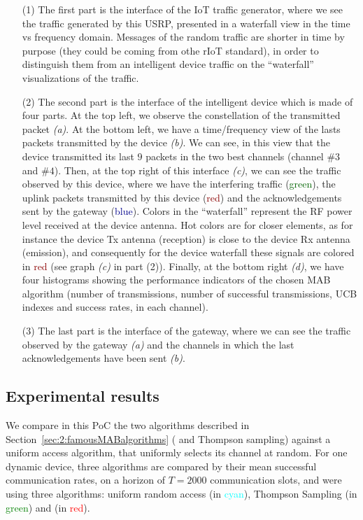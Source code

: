 \begin{enumerate}[leftmargin=6mm]
    \item[(1)]
The first part is the interface of the IoT traffic generator, where we see the traffic generated by this USRP, presented in a waterfall view in the time vs frequency domain.
Messages of the random traffic are shorter in time by purpose (they could be coming from othe rIoT standard), in order to distinguish them from an intelligent device traffic on the ``waterfall'' visualizations of the traffic.

    \item[(2)]
The second part is the interface of the intelligent device which is made of four parts.
At the top left, we observe the constellation of the transmitted packet \emph{(a)}.
At the bottom left, we have a time/frequency view of the lasts packets transmitted by the device \emph{(b)}.
We can see, in this view that the device transmitted its last $9$ packets in the two best channels (channel $\#3$ and $\#4$).
Then, at the top right of this interface \emph{(c)}, we can see the traffic observed by this device, where we have the interfering traffic (\textcolor{darkgreen}{green}), the uplink packets transmitted by this device (\textcolor{darkred}{red}) and the acknowledgements sent by the gateway (\textcolor{darkblue}{blue}).
Colors in the ``waterfall'' represent the RF power level received at the device antenna. Hot colors are for closer elements, as for instance the device Tx antenna (reception) is close to the device Rx antenna (emission), and consequently for the device waterfall these signals are colored in \textcolor{darkred}{red} (see graph \emph{(c)} in part (2)).
Finally, at the bottom right \emph{(d)}, we have four histograms showing the performance indicators of the chosen MAB algorithm (number of transmissions, number of successful transmissions, UCB indexes and success rates, in each channel).

    \item[(3)]
The last part is the interface of the gateway, where we can see the traffic observed by the gateway \emph{(a)} and the channels in which the last acknowledgements have been sent \emph{(b)}.
\end{enumerate}


\subsection{Experimental results}
\label{sub:42:results}
We compare in this PoC the two algorithms described in Section~\ref{sec:2:famousMABalgorithms} (\UCB{} and Thompson sampling) against a uniform access algorithm, that uniformly selects its channel at random.
For one dynamic device, three algorithms are compared by their mean successful communication rates, on a horizon of $T=2000$ communication slots, and were using three algorithms: uniform random access (in \textcolor{cyan}{cyan}), Thompson Sampling (in \textcolor{green}{green}) and \UCB{} (in \textcolor{red}{red}).

